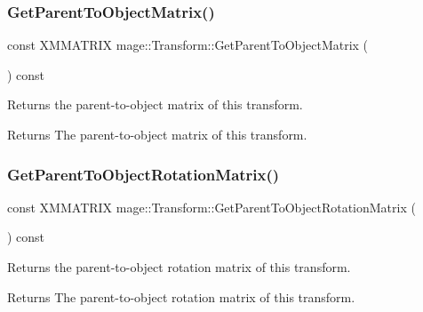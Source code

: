 \subsubsection{\texorpdfstring{Get\+Parent\+To\+Object\+Matrix()}{GetParentToObjectMatrix()}}
{\footnotesize\ttfamily const X\+M\+M\+A\+T\+R\+IX mage\+::\+Transform\+::\+Get\+Parent\+To\+Object\+Matrix (\begin{DoxyParamCaption}{ }\end{DoxyParamCaption}) const\hspace{0.3cm}{\ttfamily [noexcept]}}

Returns the parent-\/to-\/object matrix of this transform.

\begin{DoxyReturn}{Returns}
The parent-\/to-\/object matrix of this transform. 
\end{DoxyReturn}
\hypertarget{structmage_1_1_transform_a6aa076600f336e6635204a22abcdea69}{}\label{structmage_1_1_transform_a6aa076600f336e6635204a22abcdea69} 
\subsubsection{\texorpdfstring{Get\+Parent\+To\+Object\+Rotation\+Matrix()}{GetParentToObjectRotationMatrix()}}
{\footnotesize\ttfamily const X\+M\+M\+A\+T\+R\+IX mage\+::\+Transform\+::\+Get\+Parent\+To\+Object\+Rotation\+Matrix (\begin{DoxyParamCaption}{ }\end{DoxyParamCaption}) const\hspace{0.3cm}{\ttfamily [noexcept]}}

Returns the parent-\/to-\/object rotation matrix of this transform.

\begin{DoxyReturn}{Returns}
The parent-\/to-\/object rotation matrix of this transform. 
\end{DoxyReturn}
\hypertarget{structmage_1_1_transform_ab6da631ec399eb3b88b67e438dd0c002}{}\label{structmage_1_1_transform_ab6da631ec399eb3b88b67e438dd0c002} 
